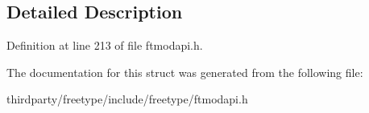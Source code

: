 \subsection{Detailed Description}


Definition at line 213 of file ftmodapi.\+h.



The documentation for this struct was generated from the following file\+:\begin{DoxyCompactItemize}
\item 
thirdparty/freetype/include/freetype/ftmodapi.\+h\end{DoxyCompactItemize}
